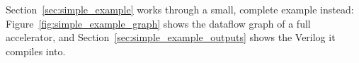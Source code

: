 %

Section~\ref{sec:simple_example} works through a small, complete example instead: Figure~\ref{fig:simple_example_graph} shows the dataflow graph of a full accelerator, and Section~\ref{sec:simple_example_outputs} shows the Verilog it compiles into.
